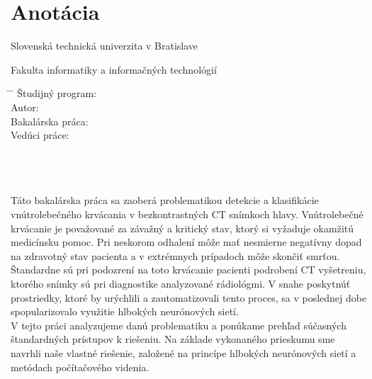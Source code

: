 \bigskip{}

\newpage{}\thispagestyle{empty}

\newpage
\thispagestyle{empty}
\mbox{}
\newpage

\thispagestyle{empty}
\section*{Anotácia}

\begin{minipage}[t]{1\columnwidth}%
Slovenská technická univerzita v Bratislave

Fakulta informatiky a informačných technológií


\begin{tabbing}
\hspace{1.5in}     \= \hspace{1in}  \= \hspace{1in}    \kill
Študijný program:       \> \myStudyProgram\\
Autor:     \> \myName                  \\
Bakalárska práca: \> \tabfill{\myTitle}   \\
Vedúci práce: \> \mySupervisor
\end{tabbing}

\myDate
\end{minipage}
\\ \\ \\
Táto bakalárska práca sa zaoberá problematikou detekcie a klasifikácie vnútrolebečného krvácania v bezkontrastných CT snímkoch hlavy. Vnútrolebečné krvácanie je považované za závažný a kritický stav, ktorý si vyžaduje okamžitú medicínsku pomoc. Pri neskorom odhalení môže mať nesmierne negatívny dopad na zdravotný stav pacienta a v extrémnych prípadoch môže skončiť smrťou. Štandardne sú pri podozrení na toto krvácanie pacienti podrobení CT vyšetreniu, ktorého snímky sú pri diagnostike analyzované rádiológmi. V snahe poskytnúť prostriedky, ktoré by urýchlili a zautomatizovali tento proces, sa v poslednej dobe spopularizovalo využitie hlbokých neurónových sietí.
\\
V tejto práci analyzujeme danú problematiku a ponúkame prehľad súčasných štandardných prístupov k riešeniu. Na základe vykonaného prieskumu sme navrhli naše vlastné riešenie, založené na princípe hlbokých neurónových sietí a metódach počítačového videnia.
\bigskip{}








% 

\newpage
\thispagestyle{empty}
\mbox{}
\newpage

